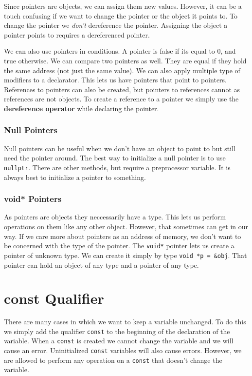 \documentclass[12pt, a4paper]{report}
\begin{document}
\noindent Since pointers are objects, we can assign them new values. However, it can be a touch confusing if we want to change the pointer or the object it points to. To change the pointer we \emph{don't} dereference the pointer. Assigning the object a pointer points to requires a dereferenced pointer.

\noindent We can also use pointers in conditions. A pointer is false if its equal to 0, and true otherwise. We can compare two pointers as well. They are equal if they hold the same address (not just the same value).
\newline We can also apply multiple type of modifiers to a declarator. This lets us have pointers that point to pointers. References to pointers can also be created, but pointers to references cannot as references are not objects. To create a reference to a pointer we simply use the \textbf{dereference operator} while declaring the pointer.
\subsubsection{Null Pointers}
Null pointers can be useful when we don't have an object to point to but still need the pointer around. The best way to initialize a null pointer is to use \verb|nullptr|. There are other methods, but require a preprocessor variable. It is always best to initialize a pointer to something.
\subsubsection{void* Pointers}
As pointers are objects they neccessarily have a type. This lets us perform operations on them like any other object. However, that sometimes can get in our way. If we care more about pointers as an address of memory, we don't want to be concerned with the type of the pointer.
The \verb|void*| pointer lets us create a pointer of unknown type. We can create it simply by type \verb|void *p = &obj|. That pointer can hold an object of any type and a pointer of any type.

\section{const Qualifier}
There are many cases in which we want to keep a variable unchanged. To do this we simply add the qualifier \verb|const| to the beginning of the declaration of the variable. When a \verb|const| is created we cannot change the variable and we will cause an error. Uninitialized \verb|const| variables will also cause errors. However, we are allowed to perform any operation on a \verb|const| that doesn't change the variable.
\end{document}
